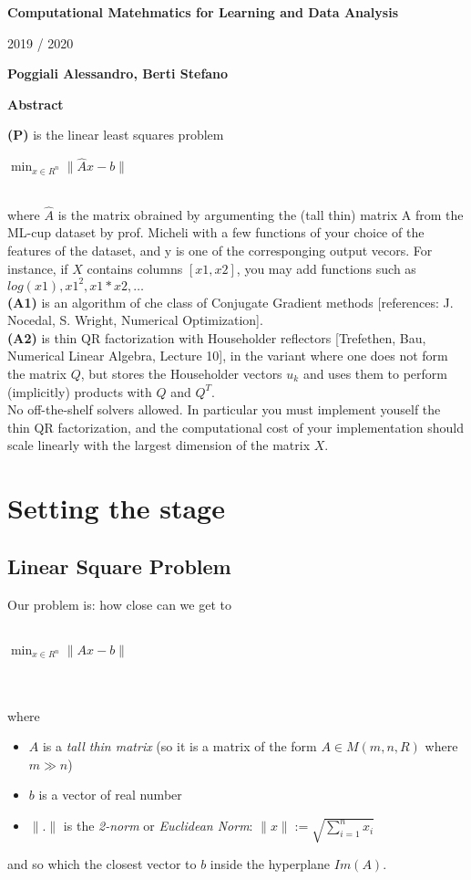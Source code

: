 \documentclass{article}
\begin{document}
\thispagestyle{plain}
\begin{center}
    \Large
    \textbf{Computational Matehmatics for Learning and Data Analysis}
        
    \vspace{0.4cm}
    \large
    2019 / 2020
        
    \vspace{0.4cm}
    \textbf{Poggiali Alessandro, Berti Stefano}
       
    \vspace{0.9cm}
    \textbf{Abstract}
\end{center}
\textbf{(P)} is the linear least squares problem
\\\centerline{$\min_{x \in R^n}\|\hat{A}x-b\|$}
\\where $\hat{A}$ is the matrix obrained by argumenting the (tall thin) matrix A from the ML-cup dataset by prof. Micheli with a few functions of your choice of the features of the dataset, and y is one of the corresponging output vecors. For instance, if $X$ contains columns $[x1, x2]$, you may add functions such as $log(x1), x1^{2}, x1*x2, \hdots$
\\\textbf{(A1)} is an algorithm of che class of Conjugate Gradient methods [references: J. Nocedal, S. Wright, Numerical Optimization].
\\\textbf{(A2)} is thin QR factorization with Householder reflectors [Trefethen, Bau, Numerical Linear Algebra, Lecture 10], in the variant where one does not form the matrix $Q$, but stores the Householder vectors $u_{k}$ and uses them to perform (implicitly) products with $Q$ and $Q^{T}$.
\\No off-the-shelf solvers allowed. In particular you must implement youself the thin QR factorization, and the computational cost of your implementation should scale linearly with the largest dimension of the matrix $X$.
\section{Setting the stage}

\subsection{Linear Square Problem}
Our problem is: how close can we get to \\\\
\centerline{$\min_{x \in R^n}\|Ax-b\|$} \\\\
where
\begin{itemize}
	\item $A$ is a \textit{tall thin matrix} (so it is a matrix of the form $A\in M(m, n, R)$ where $m \gg n$)
	\item $b$ is a vector of real number
	\item $\|.\|$ is the \textit{2-norm} or \textit{Euclidean Norm}: $\|x\| := \sqrt{\sum_{i=1}^n x_i}$
\end{itemize}
and so which the closest vector to $b$ inside the hyperplane $Im(A)$.
\end{document}

